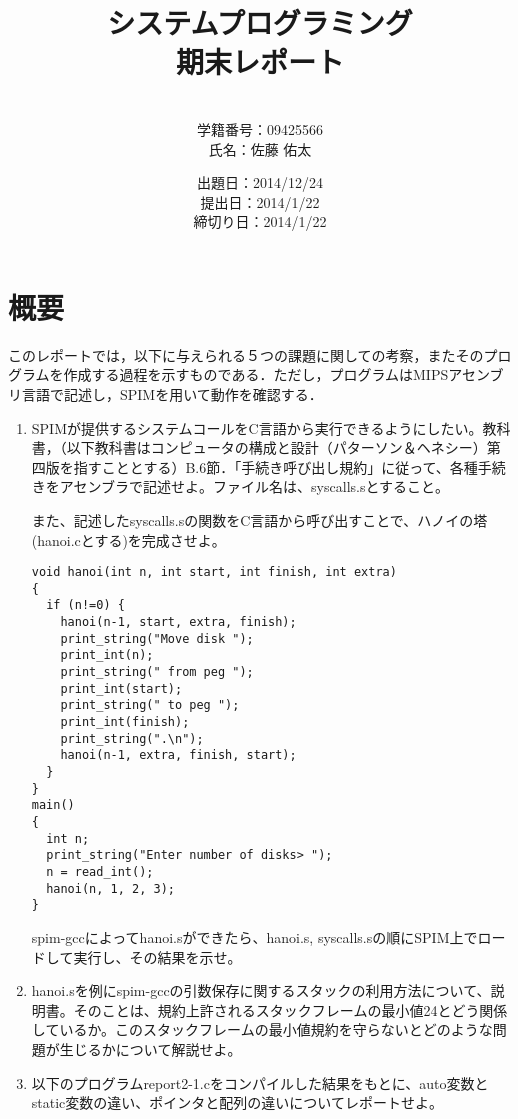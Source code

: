 \documentclass[a4j]{jarticle}
\title{システムプログラミング\\期末レポート}
\author{\\学籍番号：09425566\\氏名：佐藤 佑太}
\date{出題日：2014/12/24\\提出日：2014/1/22\\締切り日：2014/1/22\\}
\begin{document}
\maketitle

\newpage



%
%

\section{概要}

このレポートでは，以下に与えられる５つの課題に関しての考察，またそのプログラムを作成する過程を示すものである．ただし，プログラムはMIPSアセンブリ言語で記述し，SPIMを用いて動作を確認する．


\begin{enumerate}

\item SPIMが提供するシステムコールをC言語から実行できるようにしたい。教科書，（以下教科書はコンピュータの構成と設計（パターソン＆ヘネシー）第四版を指すこととする）B.6節．「手続き呼び出し規約」に従って、各種手続きをアセンブラで記述せよ。ファイル名は、syscalls.sとすること。　

また、記述したsyscalls.sの関数をC言語から呼び出すことで、ハノイの塔(hanoi.cとする)を完成させよ。

{\baselineskip 3mm
\begin{verbatim}
void hanoi(int n, int start, int finish, int extra)
{
  if (n!=0) {
    hanoi(n-1, start, extra, finish);
    print_string("Move disk ");
    print_int(n);
    print_string(" from peg ");
    print_int(start);
    print_string(" to peg ");
    print_int(finish);
    print_string(".\n");
    hanoi(n-1, extra, finish, start);
  }
}
main()
{
  int n;
  print_string("Enter number of disks> ");
  n = read_int();
  hanoi(n, 1, 2, 3);
}
\end{verbatim}
}

spim-gccによってhanoi.sができたら、hanoi.s, syscalls.sの順にSPIM上でロードして実行し、その結果を示せ。

\item hanoi.sを例にspim-gccの引数保存に関するスタックの利用方法について、説明書。そのことは、規約上許されるスタックフレームの最小値24とどう関係しているか。このスタックフレームの最小値規約を守らないとどのような問題が生じるかについて解説せよ。


\item 以下のプログラムreport2-1.cをコンパイルした結果をもとに、auto変数とstatic変数の違い、ポインタと配列の違いについてレポートせよ。


\end{enumerate}
\end{document}

